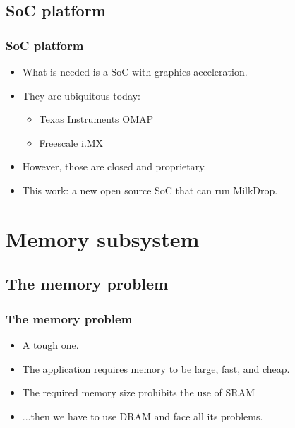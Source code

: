 \documentclass{beamer}
\begin{document}
\subsection{SoC platform}
\frame
{
  \frametitle{SoC platform}

  \begin{itemize}
  \item What is needed is a SoC with graphics acceleration.
  \item They are ubiquitous today:
  \begin{itemize}
  \item Texas Instruments OMAP
  \item Freescale i.MX
  \end{itemize}
  \item However, those are closed and proprietary.
  \item This work: a new open source SoC that can run MilkDrop.
  \end{itemize}
}


\section{Memory subsystem}
\subsection{The memory problem}
\frame
{
  \frametitle{The memory problem}

  \begin{itemize}
  \item A tough one.
  \item The application requires memory to be large, fast, and cheap.
  \item The required memory size prohibits the use of SRAM
  \item ...then we have to use DRAM and face all its problems.
  \end{itemize}
}
\end{document}
